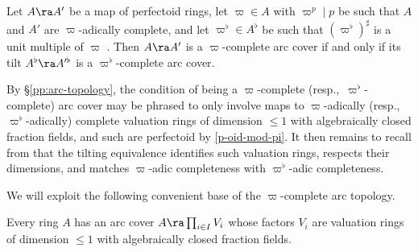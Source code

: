 \blem \label{arc-tilt}
Let $A \ra A'$ be a map of perfectoid rings, let $\varpi \in A$ with $\varpi^p \mid p$ be such that $A$ and $A'$ are $\varpi$-adically complete, and let $\varpi^\flat \in A^\flat$ be such that $(\varpi^\flat)^\sharp$ is a unit multiple of $\varpi$ . Then $A \ra A'$ is a $\varpi$-complete arc cover if and only if its tilt $A^\flat \ra A'^\flat$ is a $\varpi^\flat$-complete arc cover.
\elem

\bpf
By \S\ref{pp:arc-topology}, the condition of being a $\varpi$-complete (resp.,~$\varpi^\flat$-complete) arc cover may be phrased to only involve maps to $\varpi$-adically (resp.,~$\varpi^\flat$-adically) complete valuation rings of dimension $\le 1$ with algebraically closed fraction fields, and such are perfectoid by \eqref{p-oid-mod-pi}. It then remains to recall from  that the tilting equivalence identifies such valuation rings, respects their dimensions, and matches $\varpi$-adic completeness with $\varpi^\flat$-adic completeness.
\epf








We will exploit the following convenient base of the $\varpi$-complete arc topology.

\blem \label{lem:arc-base}
Every ring $A$  has an arc  cover $A \ra \prod_{i \in I} V_i$ whose factors $V_i$ are valuation rings  of dimension $\le 1$ with algebraically closed fraction fields. %
\elem


